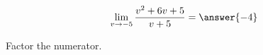\documentclass{ximera}
\author{Bart Snapp}
\begin{document}
\begin{exercise}

\[
\lim_{v\to -5 } \frac{v^2+6 v+5}{v+5} = \answer{-4}
\]
\begin{hint}
Factor  the numerator.
\end{hint}
\end{exercise}
\end{document}

